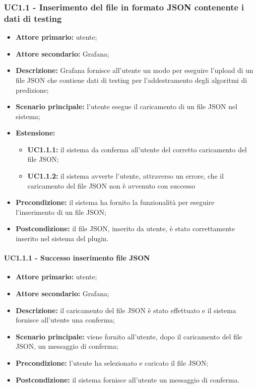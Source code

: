 \documentclass{article}
\begin{document}
	\subsubsection{UC1.1 - Inserimento del file in formato JSON contenente i dati di testing}
	\begin{itemize}
		\item \textbf{Attore primario:} utente;
		\item \textbf{Attore secondario:} Grafana;
		\item \textbf{Descrizione:} Grafana fornisce all'utente un modo per eseguire l'upload di un file JSON che contiene dati di testing per l'addestramento degli algoritmi di predizione;
		\item \textbf{Scenario principale:} l'utente esegue il caricamento di un file JSON nel sistema;
		\item \textbf{Estensione:}
			\begin{itemize}
				\item \textbf{UC1.1.1:} il sistema da conferma all'utente del corretto caricamento del file JSON;
				\item \textbf{UC1.1.2:} il sistema avverte l'utente, attraverso un errore, che il caricamento del file JSON non è avvenuto con successo
			\end{itemize}
		\item \textbf{Precondizione:} il sistema ha fornito la funzionalità per eseguire l'inserimento di un file JSON;
		\item \textbf{Postcondizione:} il file JSON, inserito da utente, è stato correttamente inserito nel sistema del plugin.
	\end{itemize}

	\paragraph{UC1.1.1 - Successo inserimento file JSON}
	\begin{itemize}
		\item \textbf{Attore primario:} utente;
		\item \textbf{Attore secondario:} Grafana;
		\item \textbf{Descrizione:} il caricamento del file JSON è stato effettuato e il sistema fornisce all'utente una conferma;
		\item \textbf{Scenario principale:} viene fornito all'utente, dopo il caricamento del file JSON, un messaggio di conferma;
		\item \textbf{Precondizione:} l'utente ha selezionato e caricato il file JSON;
		\item \textbf{Postcondizione:} il sistema fornisce all'utente un messaggio di conferma.
	\end{itemize}
\end{document}
